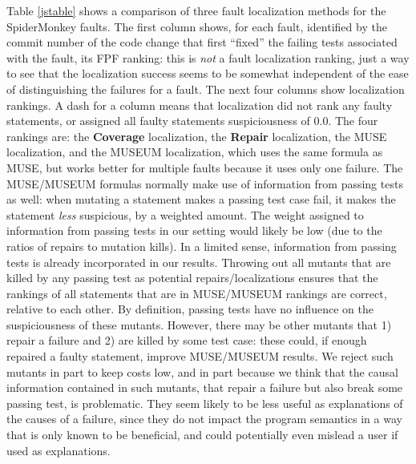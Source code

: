 Table \ref{jstable} shows a comparison of three fault localization methods for the SpiderMonkey faults.  The first column shows, for each fault, identified by the commit number of the code change that first ``fixed'' the failing tests associated with the fault, its FPF ranking: this is \emph{not} a fault localization ranking, just a way to see that the localization success seems to be somewhat independent of the ease of distinguishing the failures for a fault.  The next four columns show localization rankings.  A dash for a column means that localization did not rank any faulty statements, or assigned all faulty statements suspiciousness of 0.0.  The four rankings are: the {\bf Coverage} localization, the {\bf Repair} localization, the MUSE \cite{MUSE} localization, and the MUSEUM \cite{multilingual} localization, which uses the same formula as MUSE, but works better for multiple faults because it uses only one failure.  The MUSE/MUSEUM formulas normally make use of information from passing tests as well: when mutating a statement makes a passing test case fail, it makes the statement \emph{less} suspicious, by a weighted amount. The weight assigned to information from passing tests in our setting would likely be low (due to the ratios of repairs to mutation kills).  In a limited sense, information from passing tests is already incorporated in our results.  Throwing out all mutants that are killed by any passing test as potential repairs/localizations ensures that the rankings of all statements that are in MUSE/MUSEUM rankings are correct, relative to each other.  By definition, passing tests have no influence on the suspiciousness of these mutants.  However, there may be other mutants that 1) repair a failure and 2) are killed by some test case: these could, if enough repaired a faulty statement, improve MUSE/MUSEUM results.  We reject such mutants in part to keep costs low, and in part because we think that the causal information contained in such mutants, that repair a failure but also break some passing test, is problematic.  They seem likely to be less useful as explanations of the causes of a failure, since they do not impact the program semantics in a way that is only known to be beneficial, and could potentially even mislead a user if used as explanations.

